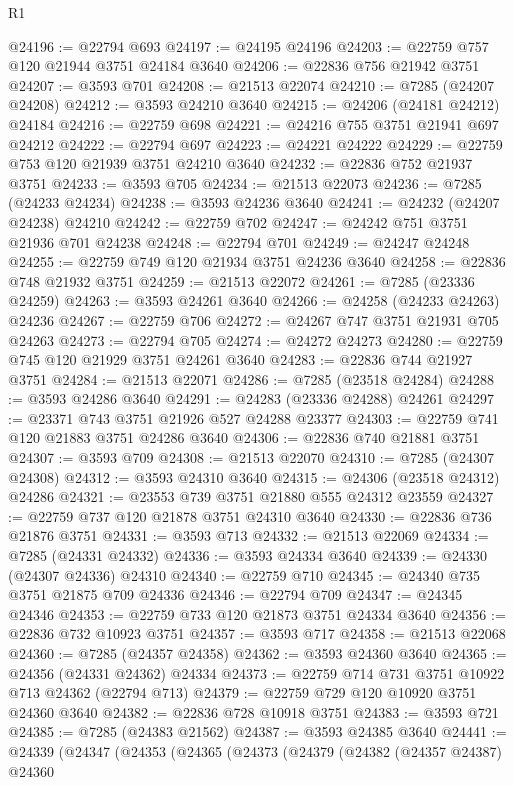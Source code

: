 \begin{lexlean}{R1}
\begin{coremodule}
@24196 := @22794 @693
@24197 := @24195 @24196
@24203 := @22759 @757 @120 @21944 @3751 @24184 @3640
@24206 := @22836 @756 @21942 @3751
@24207 := @3593 @701
@24208 := @21513 @22074
@24210 := @7285 (@24207 @24208)
@24212 := @3593 @24210 @3640
@24215 := @24206 (@24181 @24212) @24184
@24216 := @22759 @698
@24221 := @24216 @755 @3751 @21941 @697 @24212
@24222 := @22794 @697
@24223 := @24221 @24222
@24229 := @22759 @753 @120 @21939 @3751 @24210 @3640
@24232 := @22836 @752 @21937 @3751
@24233 := @3593 @705
@24234 := @21513 @22073
@24236 := @7285 (@24233 @24234)
@24238 := @3593 @24236 @3640
@24241 := @24232 (@24207 @24238) @24210
@24242 := @22759 @702
@24247 := @24242 @751 @3751 @21936 @701 @24238
@24248 := @22794 @701
@24249 := @24247 @24248
@24255 := @22759 @749 @120 @21934 @3751 @24236 @3640
@24258 := @22836 @748 @21932 @3751
@24259 := @21513 @22072
@24261 := @7285 (@23336 @24259)
@24263 := @3593 @24261 @3640
@24266 := @24258 (@24233 @24263) @24236
@24267 := @22759 @706
@24272 := @24267 @747 @3751 @21931 @705 @24263
@24273 := @22794 @705
@24274 := @24272 @24273
@24280 := @22759 @745 @120 @21929 @3751 @24261 @3640
@24283 := @22836 @744 @21927 @3751
@24284 := @21513 @22071
@24286 := @7285 (@23518 @24284)
@24288 := @3593 @24286 @3640
@24291 := @24283 (@23336 @24288) @24261
@24297 := @23371 @743 @3751 @21926 @527 @24288 @23377
@24303 := @22759 @741 @120 @21883 @3751 @24286 @3640
@24306 := @22836 @740 @21881 @3751
@24307 := @3593 @709
@24308 := @21513 @22070
@24310 := @7285 (@24307 @24308)
@24312 := @3593 @24310 @3640
@24315 := @24306 (@23518 @24312) @24286
@24321 := @23553 @739 @3751 @21880 @555 @24312 @23559
@24327 := @22759 @737 @120 @21878 @3751 @24310 @3640
@24330 := @22836 @736 @21876 @3751
@24331 := @3593 @713
@24332 := @21513 @22069
@24334 := @7285 (@24331 @24332)
@24336 := @3593 @24334 @3640
@24339 := @24330 (@24307 @24336) @24310
@24340 := @22759 @710
@24345 := @24340 @735 @3751 @21875 @709 @24336
@24346 := @22794 @709
@24347 := @24345 @24346
@24353 := @22759 @733 @120 @21873 @3751 @24334 @3640
@24356 := @22836 @732 @10923 @3751
@24357 := @3593 @717
@24358 := @21513 @22068
@24360 := @7285 (@24357 @24358)
@24362 := @3593 @24360 @3640
@24365 := @24356 (@24331 @24362) @24334
@24373 := @22759 @714 @731 @3751 @10922 @713 @24362 (@22794 @713)
@24379 := @22759 @729 @120 @10920 @3751 @24360 @3640
@24382 := @22836 @728 @10918 @3751
@24383 := @3593 @721
@24385 := @7285 (@24383 @21562)
@24387 := @3593 @24385 @3640
@24441 := @24339
    (@24347
      (@24353
        (@24365
          (@24373
            (@24379
              (@24382
                (@24357 @24387)
                @24360

\end{coremodule}
\end{lexlean}
